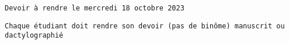 \begin{tcolorbox}[
        colback=gray!20,
        colframe=gray!20,
        width=\dimexpr\textwidth\relax, 
        arc=0pt,outer arc=0pt,
        ]

\texttt{Devoir à rendre le mercredi 18 octobre 2023}

\texttt{Chaque étudiant doit rendre son devoir (pas de binôme) manuscrit ou dactylographié}

\end{tcolorbox}